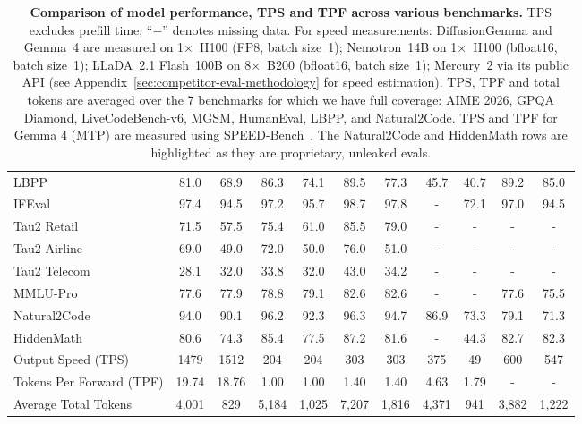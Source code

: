 \documentclass[11pt, a4paper, logo, copyright, gdm]{google}
\begin{document}
\begin{landscape}
\begin{table}[t!]
\begin{tabular}{lcccccccccc}
LBPP & 81.0 & 68.9 & 86.3 & 74.1 & 89.5 & 77.3 & 45.7 & 40.7 & 89.2 & 85.0 \\
IFEval & 97.4 & 94.5 & 97.2 & 95.7 & 98.7 & 97.8 & - & 72.1 & 97.0 & 94.5 \\
Tau2 Retail & 71.5 & 57.5 & 75.4 & 61.0 & 85.5 & 79.0 & - & - & - & - \\
Tau2 Airline & 69.0 & 49.0 & 72.0 & 50.0 & 76.0 & 51.0 & - & - & - & - \\
Tau2 Telecom & 28.1 & 32.0 & 33.8 & 32.0 & 43.0 & 34.2 & - & - & - & - \\
MMLU-Pro & 77.6 & 77.9 & 78.8 & 79.1 & 82.6 & 82.6 & - & - & 77.6 & 75.5 \\
\rowcolor{benchmarkhighlight}
Natural2Code & 94.0 & 90.1 & 96.2 & 92.3 & 96.3 & 94.7 & 86.9 & 73.3 & 79.1 & 71.3 \\
\rowcolor{benchmarkhighlight}
HiddenMath & 80.6 & 74.3 & 85.4 & 77.5 & 87.2 & 81.6 & - & 44.3 & 82.7 & 82.3 \\
\midrule
Output Speed (TPS) & 1479 & 1512 & 204 & 204 & 303 & 303 & 375 & 49 & 600 & 547 \\
Tokens Per Forward (TPF) & 19.74 & 18.76 & 1.00 & 1.00 & 1.40 & 1.40 & 4.63 & 1.79 & - & - \\
Average Total Tokens & 4,001 & 829 & 5,184 & 1,025 & 7,207 & 1,816 & 4,371 & 941 & 3,882 & 1,222 \\
\bottomrule
\end{tabular}
\caption{\textbf{Comparison of model performance, TPS and TPF across various benchmarks.} TPS excludes prefill time; ``$-$'' denotes missing data. For speed measurements: DiffusionGemma and Gemma~4 are measured on 1$\times$~H100 (FP8, batch size~1); Nemotron~14B on 1$\times$~H100 (bfloat16, batch size~1); LLaDA~2.1 Flash~100B on 8$\times$~B200 (bfloat16, batch size~1); Mercury~2 via its public API (see Appendix~\ref{sec:competitor-eval-methodology} for speed estimation). TPS, TPF and total tokens are averaged over the 7 benchmarks for which we have full coverage: AIME 2026, GPQA Diamond, LiveCodeBench-v6, MGSM, HumanEval, LBPP, and Natural2Code. TPS and TPF for Gemma 4 (MTP) are measured using SPEED-Bench~\citep{abramovich2026speed}. The Natural2Code and HiddenMath rows are highlighted as they are proprietary, unleaked evals.
}
\label{tab:model_comparison}
\end{table}


\end{landscape}
\end{document}
